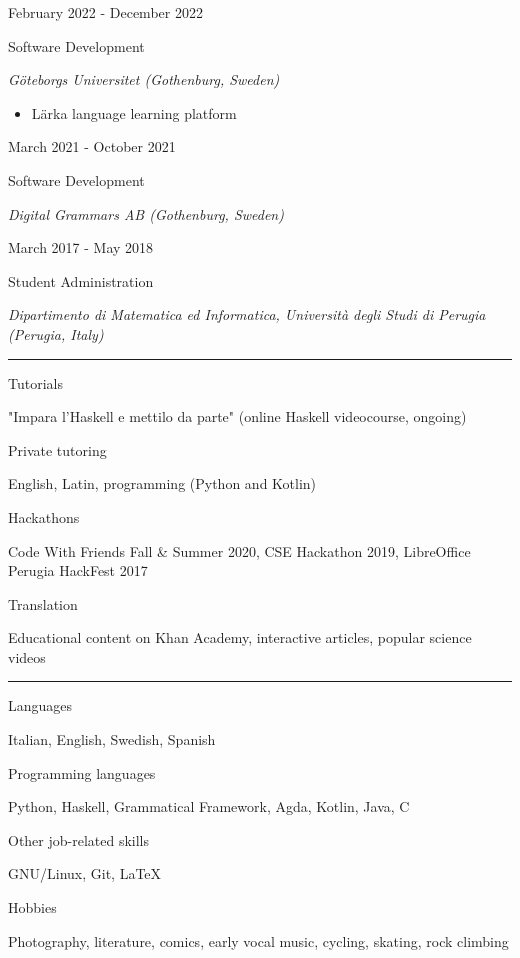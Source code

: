 \documentclass[a4paper,10pt]{article}
\newlength{\cvcolumngapwidth}
\newlength{\cvleftcolumnwidth}
\newlength{\cvrightcolumnwidth}
\newcommand{\cvsectionstyle}[1]{{\normalsize\cvsectionfont\textcolor{cvsectioncolor}{#1}}}
\newcommand{\cvtitlestyle}[1]{{\large\cvtitlefont\textcolor{cvtitlecolor}{#1}}}
\newcommand{\cvdurationstyle}[1]{{\small\cvdurationfont\textcolor{cvdurationcolor}{#1}}}
\newcommand{\cvheadingstyle}[1]{{\normalsize\cvheadingfont\textcolor{cvheadingcolor}{#1}}}
\newlength{\cvafteritemskipamount}
\newlength{\cvaftersectionskipamount}
\newlength{\cvbetweensectionandheadingextraskipamount}
\newlength{\cvaftertitleskipamount}
\newlength{\cvparskip}
\newcommand{\cvsection}[1]{
    \begin{minipage}[t]{\cvleftcolumnwidth}
        \raggedleft\cvsectionstyle{#1}
    \end{minipage}%
    \hspace{\cvcolumngapwidth}%
    \begin{minipage}[t]{\cvrightcolumnwidth}
        \textcolor{cvrulecolor}{\rule{\cvrightcolumnwidth}{0.3mm}}
    \end{minipage}

    \vspace{\cvaftersectionskipamount}
}
\newcommand{\cvitem}[2]{
    \begin{minipage}[t]{\cvleftcolumnwidth}
        \raggedleft #1
    \end{minipage}%
    \hspace{\cvcolumngapwidth}%
    \begin{minipage}[t]{\cvrightcolumnwidth}
        \setlength{\parskip}{\cvparskip} #2
    \end{minipage}

    \vspace{\cvafteritemskipamount}
}
\newcommand{\cvtitle}[1]{
    \cvtitlestyle{#1}

    \vspace{\cvaftertitleskipamount}
    \vspace{-\cvparskip}
}
\begin{document}
\cvitem{
    \cvdurationstyle{February 2022 - December 2022}
}{
    \cvtitle{Software Development}
    \textit{Göteborgs Universitet (Gothenburg, Sweden)}
    \begin{itemize}[leftmargin=*]
    \item Lärka language learning platform
    \end{itemize}
}

\cvitem{
    \cvdurationstyle{March 2021 - October 2021}
}{
    \cvtitle{Software Development}

    \textit{Digital Grammars AB (Gothenburg, Sweden)}
}

\cvitem{
    \cvdurationstyle{March 2017 - May 2018}
}{
    \cvtitle{Student Administration}

    \textit{Dipartimento di Matematica ed Informatica, Università degli Studi di Perugia (Perugia, Italy)}
    
}

%


\cvsection{OTHER EXPERIENCE}

\vspace{\cvbetweensectionandheadingextraskipamount}

\cvitem{
    \cvheadingstyle{Tutorials}
}{
    "Impara l'Haskell e mettilo da parte" (online Haskell videocourse, ongoing)
}

\cvitem{
    \cvheadingstyle{Private tutoring}
}{
    English, Latin, programming (Python and Kotlin)
}

\cvitem{
    \cvheadingstyle{Hackathons}
}{
    Code With Friends Fall \& Summer 2020, CSE Hackathon 2019, LibreOffice Perugia HackFest 2017 
}

\cvitem{
    \cvheadingstyle{Translation}
}{
    Educational content on Khan Academy, interactive articles, popular science videos
}


\cvsection{SKILLS AND INTERESTS}

\vspace{\cvbetweensectionandheadingextraskipamount}

\cvitem{
    \cvheadingstyle{Languages}
}{
    Italian, English, Swedish, Spanish
}

\cvitem{
    \cvheadingstyle{Programming languages}
}{
    Python, Haskell, Grammatical Framework, Agda, Kotlin, Java, C
}

\cvitem{
    \cvheadingstyle{Other job-related skills}
}{
    GNU/Linux, Git, LaTeX
}

\cvitem{
    \cvheadingstyle{Hobbies}
}{
    Photography, literature, comics, early vocal music, cycling, skating, rock climbing 
}
\end{document}
